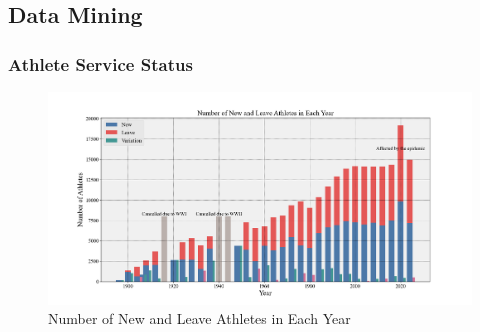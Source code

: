 \documentclass[12pt]{article}  %
\begin{document}
\subsection{Data Mining}
\subsubsection{Athlete Service Status}


\begin{figure}[htbp]
	\centering
	\includegraphics[width=12cm]{img/Number.png}
	\caption{Number of New and Leave Athletes in Each Year}
	\label{fig:aa}
\end{figure}
\end{document}
